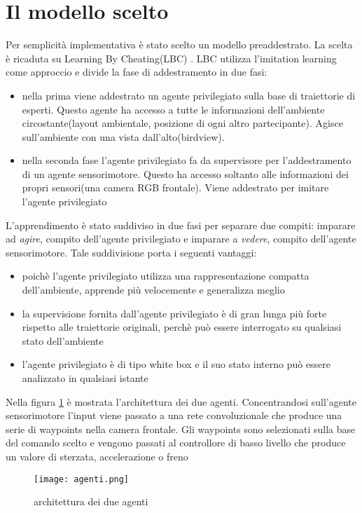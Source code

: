 \section{Il modello scelto}
Per semplicità implementativa è stato scelto un modello preaddestrato. La scelta è ricaduta su Learning By Cheating(LBC) \cite{lbc}. LBC utilizza l'imitation learning come
approccio e divide la fase di addestramento in due fasi: \begin{itemize}
    \item nella prima viene addestrato un agente privilegiato sulla base di traiettorie di esperti. Questo agente ha accesso a tutte le informazioni 
    dell'ambiente circostante(layout ambientale, posizione di ogni altro partecipante). Agisce sull'ambiente con una vista dall'alto(birdview).
    \item nella seconda fase l'agente privilegiato fa da supervisore per l'addestramento di un agente sensorimotore. Questo ha accesso soltanto alle informazioni dei
    propri sensori(una camera RGB frontale). Viene addestrato per imitare l'agente privilegiato
\end{itemize}
L'apprendimento è stato suddiviso in due fasi per separare due compiti: imparare ad \emph{agire}, compito dell'agente privilegiato e imparare a \emph{vedere}, compito dell'agente sensorimotore.
Tale suddivisione porta i seguenti vantaggi:\begin{itemize}
    \item poichè l'agente privilegiato utilizza una rappresentazione compatta dell'ambiente, apprende più velocemente e generalizza meglio
    \item la supervisione fornita dall'agente privilegiato è di gran lunga più forte rispetto alle traiettorie originali, perchè può essere interrogato 
    su qualsiasi stato dell'ambiente
    \item l'agente privilegiato è di tipo white box e il suo stato interno può essere analizzato in qualsiasi istante
\end{itemize}
Nella figura \ref{fig:arch} è mostrata l'architettura dei due agenti. Concentrandosi sull'agente sensorimotore  l'input viene passato a una rete convoluzionale che produce una serie di 
waypoints nella camera frontale. Gli waypoints  sono selezionati sulla base del comando scelto e vengono passati al controllore di basso livello che produce un valore di sterzata, accelerazione o freno
\begin{figure}[h!]
    \texttt{[image: agenti.png]}
    \caption{architettura dei due agenti\cite{lbc}}
    \label{fig:arch}
\end{figure}
